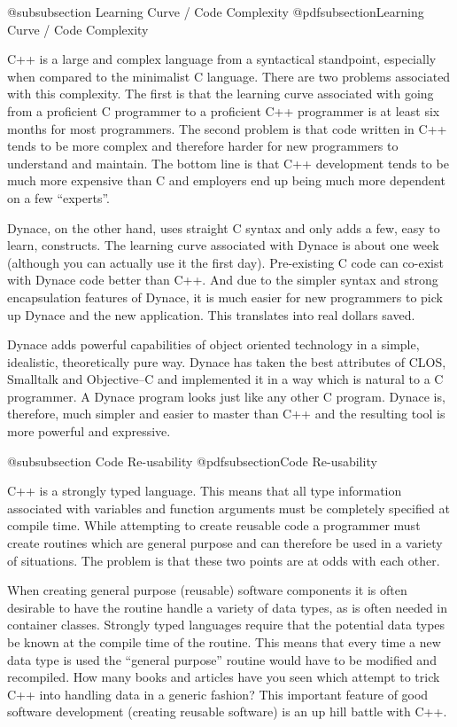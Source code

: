 @subsubsection Learning Curve / Code Complexity
@pdfsubsection{Learning Curve / Code Complexity}

C++ is a large and complex language from a syntactical standpoint,
especially when compared to the minimalist C language.  There are two
problems associated with this complexity.  The first is that the
learning curve associated with going from a proficient C programmer to
a proficient C++ programmer is at least six months for most
programmers.  The second problem is that code written in C++ tends
to be more complex and therefore harder for new programmers to
understand and maintain.  The bottom line is that C++ development
tends to be much more expensive than C and employers end up being
much more dependent on a few ``experts''.

Dynace, on the other hand, uses straight C syntax and only adds a few,
easy to learn, constructs.  The learning curve associated with Dynace
is about one week (although you can actually use it the first day).
Pre-existing C code can co-exist with Dynace code better than C++.
And due to the simpler syntax and strong encapsulation features of
Dynace, it is much easier for new programmers to pick up Dynace and
the new application.  This translates into real dollars saved.

Dynace adds powerful capabilities of object oriented technology in a
simple, idealistic, theoretically pure way.  Dynace has taken the best
attributes of CLOS, Smalltalk and Objective--C and implemented it in a
way which is natural to a C programmer.  A Dynace program looks just
like any other C program.  Dynace is, therefore, much simpler and easier
to master than C++ and the resulting tool is more powerful and expressive.

@subsubsection Code Re-usability
@pdfsubsection{Code Re-usability}

C++ is a strongly typed language.  This means that all type information
associated with variables and function arguments must be completely
specified at compile time.  While attempting to create reusable code
a programmer must create routines which are general purpose and can
therefore be used in a variety of situations.  The problem is that
these two points are at odds with each other.

When creating general purpose (reusable) software components it is often
desirable to have the routine handle a variety of data types, as is
often needed in container classes.  Strongly typed languages require
that the potential data types be known at the compile time of the routine.
This means that every time a new data type is used the ``general purpose''
routine would have to be modified and recompiled.  How many books and
articles have you seen which attempt to trick C++ into handling data
in a generic fashion?  This important feature of good software development
(creating reusable software) is an up hill battle with C++.

